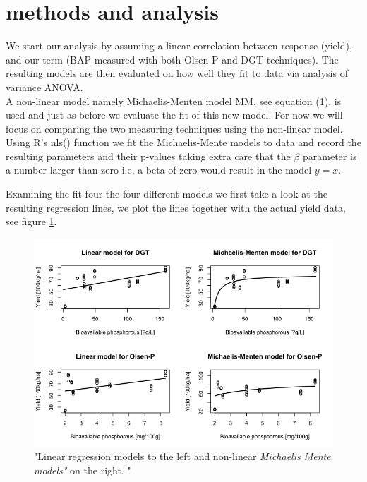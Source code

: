 \documentclass{article}
\begin{document}
\section{methods and analysis}
We start our analysis by assuming a linear correlation between response (yield), and our term (BAP measured with both Olsen P and DGT techniques). The resulting models are then evaluated on how well they fit to data via analysis of variance ANOVA. \\ A non-linear model namely Michaelis-Menten model MM, see equation (1), is used and just as before we evaluate the fit of this new model.
For now we will focus on comparing the two measuring techniques using the non-linear model. \\ Using R's nls() function we fit the Michaelis-Mente models to data and record the resulting parameters and their p-values taking extra care that the $\beta$ parameter is a number larger than zero i.e. a beta of zero would result in the model $y = x$. 

Examining the fit four the four different models we first take a look at the resulting regression lines, we plot the lines together with the actual yield data, see figure \ref{fig:linearnonlinear}.
\begin{figure}[H]
	\includegraphics[width=\linewidth]{linearnonlinear.png}
	\caption{"Linear regression models to the left and non-linear \textit{Michaelis Mente models"} on the right. "}
	\label{fig:linearnonlinear}
\end{figure}
\end{document}
